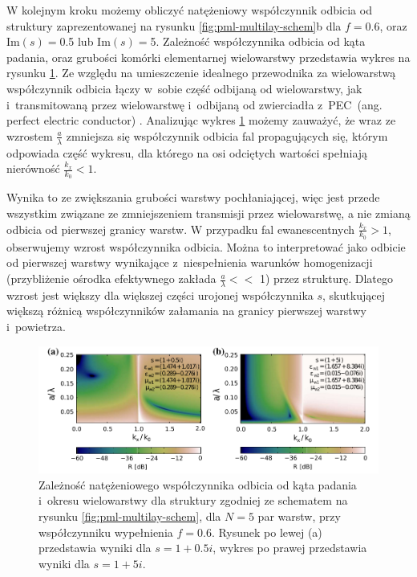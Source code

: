 W kolejnym kroku możemy obliczyć natężeniowy współczynnik odbicia od struktury zaprezentowanej na rysunku \ref{fig:pml-multilay-schem}b dla $f=0.6$, oraz $\textrm{Im}(s)=$0.5 lub $\textrm{Im}(s)=$5. Zależność współczynnika odbicia od kąta padania, oraz grubości komórki elementarnej wielowarstwy przedstawia wykres na rysunku \ref{fig:oqe3}. Ze względu na umieszczenie idealnego przewodnika za wielowarstwą współczynnik odbicia łączy w~sobie część odbijaną od wielowarstwy, jak i~transmitowaną przez wielowarstwę i~odbijaną od zwierciadła z~PEC~(ang. perfect electric conductor) . Analizując wykres \ref{fig:oqe3} możemy zauważyć, że wraz ze wzrostem $\frac{a}{\lambda}$ zmniejsza się współczynnik odbicia fal propagujących się, którym odpowiada część wykresu, dla którego na osi odciętych wartości spełniają nierówność $\frac{k_x}{k_0}<1$.

Wynika to ze zwiększania grubości warstwy pochłaniającej, więc jest przede wszystkim związane ze zmniejszeniem transmisji przez wielowarstwę, a nie zmianą odbicia od pierwszej granicy warstw. W przypadku fal ewanescentnych $\frac{k_x}{k_0}>1$, obserwujemy wzrost współczynnika odbicia. Można to interpretować jako odbicie od pierwszej warstwy wynikające z~niespełnienia warunków homogenizacji (przybliżenie ośrodka efektywnego zakłada $\frac{a}{\lambda} <<$ 1) przez strukturę. Dlatego wzrost jest większy dla większej części urojonej współczynnika $s$, skutkującej większą różnicą współczynników załamania na granicy pierwszej warstwy i~powietrza.

\begin{figure}[tb]
	\includegraphics[width=\textwidth]{images/pml/fig3.png}
	\caption{Zależność natężeniowego współczynnika odbicia od kąta padania i~okresu wielowarstwy dla struktury zgodniej ze schematem na rysunku \ref{fig:pml-multilay-schem}, dla $N=5$ par warstw, przy współczynniku wypełnienia $f=0.6$. Rysunek po lewej (a) przedstawia wyniki dla $s=1+0.5i$, wykres po prawej przedstawia wyniki dla $s=1+5i$.}
	\label{fig:oqe3}
\end{figure}

